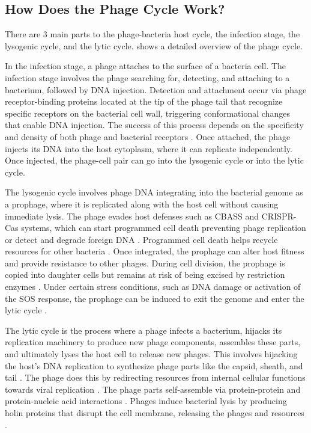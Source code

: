 \subsection{How Does the Phage Cycle Work?}
There are 3 main parts to the phage-bacteria host cycle, the infection stage, the lysogenic cycle, and the lytic cycle. 
 shows a detailed overview of the phage cycle. 

In the infection stage, a phage attaches to the surface of a bacteria cell. 
The infection stage involves the phage searching for, detecting, and attaching to a bacterium, followed by DNA injection. 
Detection and attachment occur via phage receptor-binding proteins located at the tip of the phage tail that recognize specific receptors on the bacterial cell wall, triggering conformational changes that enable DNA injection. 
The success of this process depends on the specificity and density of both phage and bacterial receptors \cite{stoneUnderstandingExploitingPhage2019}. 
Once attached, the phage injects its DNA into the host cytoplasm, where it can replicate independently.
Once injected, the phage-cell pair can go into the lysogenic cycle or into the lytic cycle. 

The lysogenic cycle involves phage DNA integrating into the bacterial genome as a prophage, where it is replicated along with the host cell without causing immediate lysis.
The phage evades host defenses such as CBASS and CRISPR-Cas systems, which can start programmed cell death preventing phage replication or detect and degrade foreign DNA \cite{banhBacterialCGASSenses2023, levyCRISPRAdaptationBiases2015}. 
Programmed cell death helps recycle resources for other bacteria \cite{warwick-dugdaleHosthijackingPlanktonicPiracy2019}. 
Once integrated, the prophage can alter host fitness and provide resistance to other phages. 
During cell division, the prophage is copied into daughter cells but remains at risk of being excised by restriction enzymes \cite{sharpMolecularEvolutionBacteriophages1986}.
Under certain stress conditions, such as DNA damage or activation of the SOS response, the prophage can be induced to exit the genome and enter the lytic cycle \cite{waldorPhageRegulatoryCircuits2005, stoneUnderstandingExploitingPhage2019, fortierImportanceProphagesEvolution2013}.

The lytic cycle is the process where a phage infects a bacterium, hijacks its replication machinery to produce new phage components, assembles these parts, and ultimately lyses the host cell to release new phages. 
This involves hijacking the host's DNA replication to synthesize phage parts like the capsid, sheath, and tail . 
The phage does this by redirecting resources from internal cellular functions towards viral replication \cite{warwick-dugdaleHosthijackingPlanktonicPiracy2019}. 
The phage parts self-assemble via protein-protein and protein-nucleic acid interactions \cite{aksyukBacteriophageAssembly2011}. 
Phages induce bacterial lysis by producing holin proteins that disrupt the cell membrane, releasing the phages and resources \cite{wangHolinsProteinClocks2000}.

